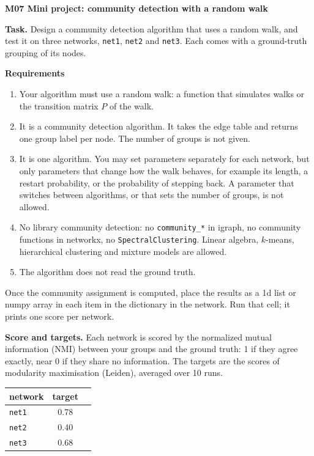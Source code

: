 \documentclass[a4paper, 12pt]{extarticle}
\begin{document}
{\Large\bfseries M07 Mini project: community detection with a random walk}

\textbf{Task.} Design a community detection algorithm that uses a random walk, and
test it on three networks, \texttt{net1}, \texttt{net2} and \texttt{net3}. Each
comes with a ground-truth grouping of its nodes.

\textbf{Requirements}
\begin{enumerate}[leftmargin=1.6em, itemsep=0.2em, topsep=0.2em]
  \item Your algorithm must use a random walk: a function that simulates walks or the
        transition matrix $P$ of the walk.
  \item It is a community detection algorithm. It takes the edge table and returns one
        group label per node. The number of groups is not given.
  \item It is one algorithm. You may set parameters separately for each network, but
        only parameters that change how the walk behaves, for example its length, a
        restart probability, or the probability of stepping back. A parameter that
        switches between algorithms, or that sets the number of groups, is not allowed.
  \item No library community detection: no \texttt{community\_*} in igraph, no
        community functions in networkx, no \texttt{SpectralClustering}. Linear
        algebra, $k$-means, hierarchical clustering and mixture models are allowed.
  \item The algorithm does not read the ground truth.
\end{enumerate}

Once the community assignment is computed, place the results as a 1d list or numpy array in each item in the dictionary in the network. Run that cell; it prints one score per network.

\textbf{Score and targets.} Each network is scored by the normalized mutual
information (NMI) between your groups and the ground truth: 1 if they agree exactly,
near 0 if they share no information. The targets are the scores of modularity
maximisation (Leiden), averaged over 10 runs.

\begin{center}
\begin{tabular}{lcc}
  \hline
  network & target & \\
  \hline
  \texttt{net1} & 0.78 & \\
  \texttt{net2} & 0.40 & \\
  \texttt{net3} & 0.68 & \\
  \hline
\end{tabular}
\end{center}
\end{document}
